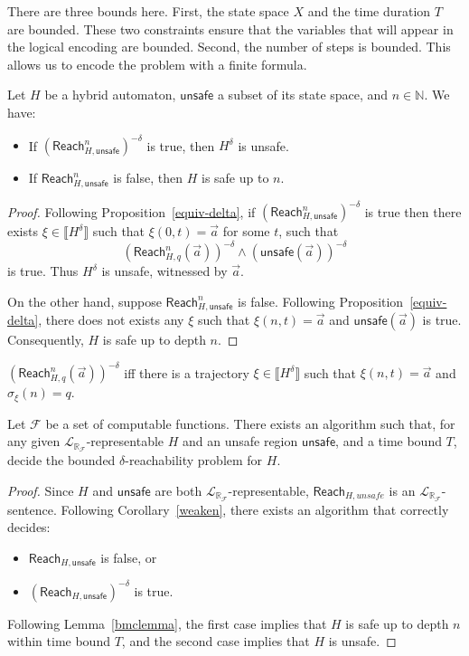 \documentclass[envcountsect]{llncs}
\newcommand{\reach}{\mathsf{Reach}}
\newcommand{\unsafe}{\mathsf{unsafe}}
\newcommand{\lrf}{\mathcal{L}_{\mathbb{R}_{\mathcal{F}}}}
\begin{document}
\begin{remark}
There are three bounds here. First, the state space $X$ and the time duration $T$ are bounded. These two constraints ensure that the variables that will appear in the logical encoding are bounded. Second, the number of steps is bounded. This allows us to encode the problem with a finite formula.
\end{remark}


\begin{lemma}\label{bmclemma}
Let $H$ be a hybrid automaton, $\unsafe$ a subset of its state space, and $n\in\mathbb{N}$. We have:
\begin{itemize}
\item If $(\reach^n_{H,\unsafe})^{-\delta}$ is true, then $H^{\delta}$ is unsafe.
\item If $\reach^n_{H,\unsafe}$ is false, then $H$ is safe up to $n$.
\end{itemize}
\end{lemma}

\begin{proof}
Following Proposition~\ref{equiv-delta}, if $(\reach^n_{H,\unsafe})^{-\delta}$ is true then there exists $\xi\in \llbracket H^{\delta}\rrbracket$ such that $\xi(0,t)=\vec a$ for some $t$, such that
$$(\reach^n_{H,q}(\vec a))^{-\delta} \wedge (\unsafe(\vec a))^{-\delta}$$
is true. Thus $H^{\delta}$ is unsafe, witnessed by $\vec a$.

On the other hand, suppose $\reach^n_{H,\unsafe}$ is false. Following Proposition~\ref{equiv-delta}, there does not exists any $\xi$ such that $\xi(n,t) = \vec a$ and $\unsafe(\vec a)$ is true. Consequently, $H$ is safe up to depth $n$.
\end{proof}


\begin{proposition}\label{equiv-delta}
$(\reach_{H,q}^n(\vec a))^{-\delta}$ iff there is a trajectory $\xi\in
\llbracket H^{\delta}\rrbracket$ such that $\xi(n, t) = \vec a$ and
$\sigma_{\xi}(n) = q$.
\end{proposition}




\begin{theorem}
Let $\mathcal{F}$ be a set of computable functions. There exists an algorithm such that, for any given $\lrf$-representable $H$ and an unsafe region $\unsafe$, and a time bound $T$, decide the bounded $\delta$-reachability problem for $H$.
\end{theorem}

\begin{proof}
Since $H$ and $\unsafe$ are both $\lrf$-representable, $\reach_{H,unsafe}$ is an $\lrf$-sentence. Following Corollary~\ref{weaken}, there exists an algorithm that correctly decides:
\begin{itemize}
\item $\reach_{H,\unsafe}$ is false, or
\item $(\reach_{H,\unsafe})^{-\delta}$ is true.
\end{itemize}
Following Lemma~\ref{bmclemma}, the first case implies that $H$ is safe up to depth $n$ within time bound $T$, and the second case implies that $H$ is unsafe.
\end{proof}
\end{document}
